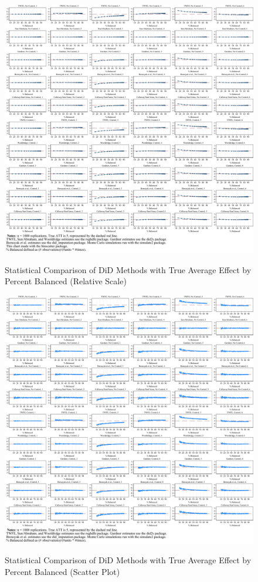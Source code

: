 \documentclass[12pt]{article}
\begin{document}
\begin{figure}
    \centering
    \caption{Statistical Comparison of DiD Methods with True Average Effect by Percent Balanced (Relative Scale)}
    \includegraphics[width=6in]{Figures/Binscatters by Percent Balanced Common Scale.jpg}
    \label{fig:bins-balance-full}
\end{figure}

\begin{figure}
    \centering
    \caption{Statistical Comparison of DiD Methods with True Average Effect by Percent Balanced (Scatter Plot)}
    \includegraphics[width=6in]{Figures/Scatters by Percent Balanced Common Scale.jpg}
    \label{fig:scatters-common}
\end{figure}
\end{document}

